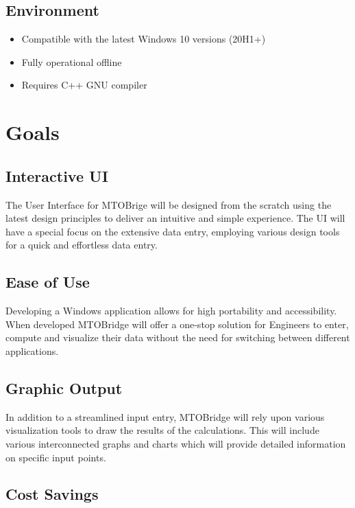 \documentclass{article}
\begin{document}
\subsection{Environment}
\begin{itemize}
  \item Compatible with the latest Windows 10 versions (20H1+)
  \item Fully operational offline 
  \item Requires C++ GNU compiler 
\end{itemize}

\section{Goals}

\subsection {Interactive UI}

The User Interface for MTOBrige will be designed from the scratch using the latest design principles to deliver an intuitive and simple experience. The UI will have a special focus on the extensive data entry, employing various design tools for a quick and effortless data entry. 

\subsection {Ease of Use}

Developing a Windows application allows for high portability and accessibility. When developed MTOBridge will offer a one-stop solution for Engineers to enter, compute and visualize their data without the need for switching between different applications. 

\subsection {Graphic Output}

In addition to a streamlined input entry, MTOBridge will rely upon various visualization tools to draw the results of the calculations. This will include various interconnected graphs and charts which will provide detailed information on specific input points.

\subsection {Cost Savings}
\end{document}
